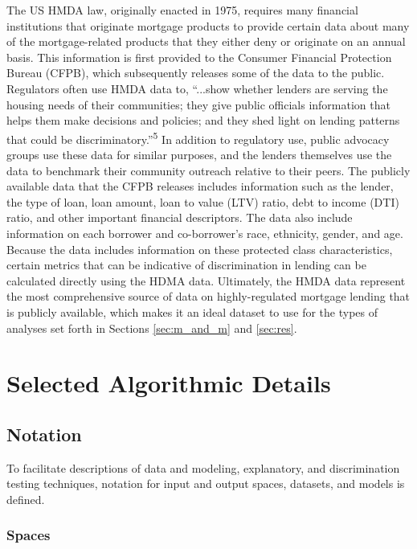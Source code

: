 \documentclass[information,article,submit,moreauthors,pdftex]{definitions/mdpi}
\begin{document}
The US HMDA law, originally enacted in 1975, requires many financial institutions that originate mortgage products to provide certain data about many of the mortgage-related products that they either deny or originate on an annual basis. This information is first provided to the Consumer Financial Protection Bureau (CFPB), which subsequently releases some of the data to the public. Regulators often use HMDA data to, ``...show whether lenders are serving the housing needs of their communities; they give public officials information that helps them make decisions and policies; and they shed light on lending patterns that could be discriminatory.''\textsuperscript{5} In addition to regulatory use, public advocacy groups use these data for similar purposes, and the lenders themselves use the data to benchmark their community outreach relative to their peers.  The publicly available data that the CFPB releases includes information such as the lender, the type of loan, loan amount, loan to value (LTV) ratio, debt to income (DTI) ratio, and other important financial descriptors. The data also include information on each borrower and co-borrower’s race, ethnicity, gender, and age. Because the data includes information on these protected class characteristics, certain metrics that can be indicative of discrimination in lending can be calculated directly using the HDMA data. Ultimately, the HMDA data represent the most comprehensive source of data on highly-regulated mortgage lending that is publicly available, which makes it an ideal dataset to use for the types of analyses set forth in Sections \ref{sec:m_and_m} and \ref{sec:res}.  

\section{Selected Algorithmic Details}\label{a_sec:algo}

\subsection{Notation}\label{a_ssec:not}

To facilitate descriptions of data and modeling, explanatory, and discrimination testing techniques, notation for input and output spaces, datasets, and models is defined.

\subsubsection{Spaces} 
\end{document}
